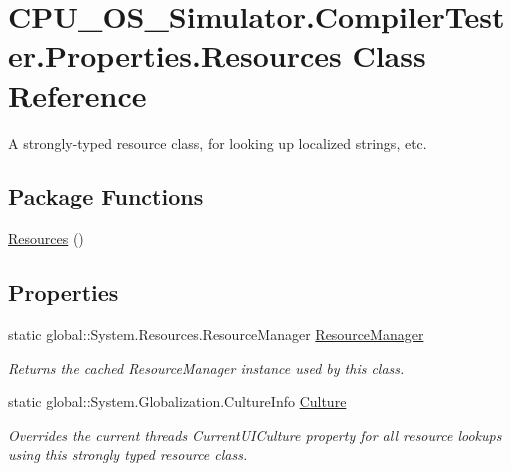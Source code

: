 \hypertarget{class_c_p_u___o_s___simulator_1_1_compiler_tester_1_1_properties_1_1_resources}{}\section{C\+P\+U\+\_\+\+O\+S\+\_\+\+Simulator.\+Compiler\+Tester.\+Properties.\+Resources Class Reference}
\label{class_c_p_u___o_s___simulator_1_1_compiler_tester_1_1_properties_1_1_resources}


A strongly-\/typed resource class, for looking up localized strings, etc.  


\subsection*{Package Functions}
\begin{DoxyCompactItemize}
\item 
\hyperlink{class_c_p_u___o_s___simulator_1_1_compiler_tester_1_1_properties_1_1_resources_aff6e0c64a695ca491292a12612d9676f}{Resources} ()
\end{DoxyCompactItemize}
\subsection*{Properties}
\begin{DoxyCompactItemize}
\item 
static global\+::\+System.\+Resources.\+Resource\+Manager \hyperlink{class_c_p_u___o_s___simulator_1_1_compiler_tester_1_1_properties_1_1_resources_acded12adee371e9156c9eb76d6517b54}{Resource\+Manager}
\begin{DoxyCompactList}\small\item\em Returns the cached Resource\+Manager instance used by this class. \end{DoxyCompactList}\item 
static global\+::\+System.\+Globalization.\+Culture\+Info \hyperlink{class_c_p_u___o_s___simulator_1_1_compiler_tester_1_1_properties_1_1_resources_a807802b7b284da0be79ea3aa4402dca8}{Culture}
\begin{DoxyCompactList}\small\item\em Overrides the current thread\textquotesingle{}s Current\+U\+I\+Culture property for all resource lookups using this strongly typed resource class. \end{DoxyCompactList}\end{DoxyCompactItemize}
